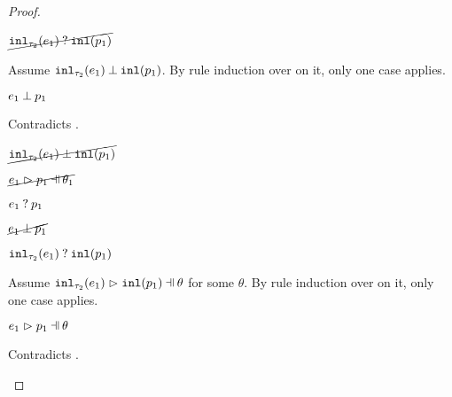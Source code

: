 \begin{proof}
\begin{byCases}
\begin{byCases}
\begin{byCases}
            \begin{pfsteps*}
            \item $\cancel{\mathtt{inl}_{\tau_2}({e_1}) \mathbin{?} \mathtt{inl}(p_1)}$ 
            \end{pfsteps*}
            Assume $\mathtt{inl}_{\tau_2}({e_1}) \mathbin{\bot} \mathtt{inl}(p_1)$. By rule induction over  on it, only one case applies.
            \begin{byCases}
            \item[\text{(\ref{rule:NMInl})}]
                \begin{pfsteps*}
                \item $e_1 \mathbin{\bot} p_1$ 
                \end{pfsteps*}
                Contradicts .
            \end{byCases}
            \begin{pfsteps*}
            \item $\cancel{\mathtt{inl}_{\tau_2}({e_1}) \mathbin{\bot} \mathtt{inl}(p_1)}$ 
            \end{pfsteps*}
        \item[\hmaymatch{e_1}{p_1}]
            \begin{pfsteps*}
            \item $\cancel{\hpatmatch{e_1}{p_1}{\theta_1}}$  
            \item $e_1 \mathbin{?} p_1$  
            \item $\cancel{e_1 \mathbin{\bot} p_1}$  
            \item $\mathtt{inl}_{\tau_2}({e_1}) \mathbin{?} \mathtt{inl}(p_1)$ 
            \end{pfsteps*}
            Assume $\hpatmatch{\hinl{\tau_2}{e_1}}{\hinlp{p_1}}{\theta}$ for some $\theta$. By rule induction over  on it, only one case applies.
            \begin{byCases}
            \item[\text{(\ref{rule:MInl})}]
                \begin{pfsteps*}
                \item $\hpatmatch{e_1}{p_1}{\theta}$ 
                \end{pfsteps*}
                Contradicts .

\end{byCases}
\end{byCases}
\end{byCases}
\end{byCases}
\end{proof}
